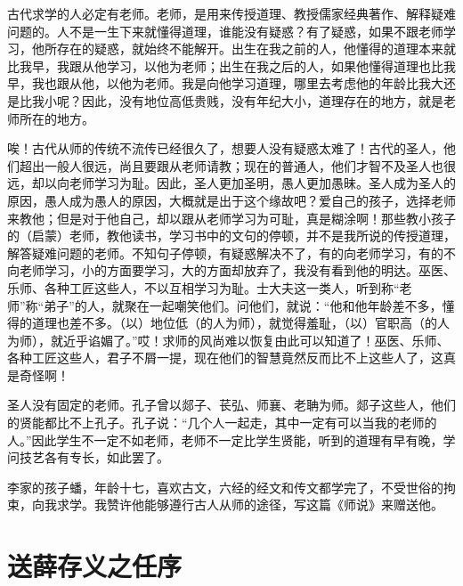 \documentclass[12pt,UTF-8,openany,a4]{ctexbook}
\begin{document}
\begin{large}\yiwen
    
    古代求学的人必定有老师。老师，是用来传授道理、教授儒家经典著作、解释疑难问题的。人不是一生下来就懂得道理，谁能没有疑惑？有了疑惑，如果不跟老师学习，他所存在的疑惑，就始终不能解开。出生在我之前的人，他懂得的道理本来就比我早，我跟从他学习，以他为老师；出生在我之后的人，如果他懂得道理也比我早，我也跟从他，以他为老师。我是向他学习道理，哪里去考虑他的年龄比我大还是比我小呢？因此，没有地位高低贵贱，没有年纪大小，道理存在的地方，就是老师所在的地方。
    
    唉！古代从师的传统不流传已经很久了，想要人没有疑惑太难了！古代的圣人，他们超出一般人很远，尚且要跟从老师请教；现在的普通人，他们才智不及圣人也很远，却以向老师学习为耻。因此，圣人更加圣明，愚人更加愚昧。圣人成为圣人的原因，愚人成为愚人的原因，大概就是出于这个缘故吧？爱自己的孩子，选择老师来教他；但是对于他自己，却以跟从老师学习为可耻，真是糊涂啊！那些教小孩子的（启蒙）老师，教他读书，学习书中的文句的停顿，并不是我所说的传授道理，解答疑难问题的老师。不知句子停顿，有疑惑解决不了，有的向老师学习，有的不向老师学习，小的方面要学习，大的方面却放弃了，我没有看到他的明达。巫医、乐师、各种工匠这些人，不以互相学习为耻。士大夫这一类人，听到称“老师”称“弟子”的人，就聚在一起嘲笑他们。问他们，就说：“他和他年龄差不多，懂得的道理也差不多。（以）地位低（的人为师），就觉得羞耻，（以）官职高（的人为师），就近乎谄媚了。”哎！求师的风尚难以恢复由此可以知道了！巫医、乐师、各种工匠这些人，君子不屑一提，现在他们的智慧竟然反而比不上这些人了，这真是奇怪啊！
    
    圣人没有固定的老师。孔子曾以郯子、苌弘、师襄、老聃为师。郯子这些人，他们的贤能都比不上孔子。孔子说：“几个人一起走，其中一定有可以当我的老师的人。”因此学生不一定不如老师，老师不一定比学生贤能，听到的道理有早有晚，学问技艺各有专长，如此罢了。
    
    李家的孩子蟠，年龄十七，喜欢古文，六经的经文和传文都学完了，不受世俗的拘束，向我求学。我赞许他能够遵行古人从师的途径，写这篇《师说》来赠送他。
    

\end{large}



\chapter{送薛存义之任序}
\end{document}
